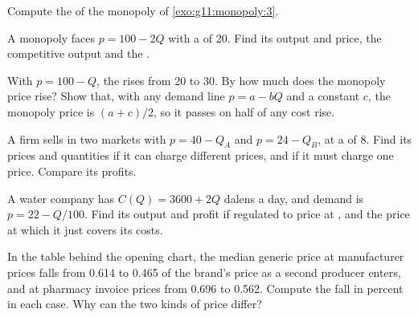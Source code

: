 \begin{exercise}[$\star\star$]\label{exo:g11:monopoly:6}
Compute the  of the monopoly of \cref{exo:g11:monopoly:3}.
\end{exercise}

\begin{exercise}[$\star\star$]\label{exo:g11:monopoly:7}
A monopoly faces $p = 100 - 2Q$ with a  of 20. Find its output and price, the competitive output and the .
\end{exercise}

\begin{exercise}[$\star\star$]\label{exo:g11:monopoly:8}
With $p = 100 - Q$, the  rises from 20 to 30. By how much does the monopoly price rise? Show that, with any demand line $p = a - bQ$ and a constant  $c$, the monopoly price is $(a + c)/2$, so it passes on half of any cost rise.
\end{exercise}

\begin{exercise}[$\star\star$]\label{exo:g11:monopoly:9}
A firm sells in two markets with $p = 40 - Q_A$ and $p = 24 - Q_B$, at a  of 8. Find its prices and quantities if it can charge different prices, and if it
must charge one price. Compare its profits.
\end{exercise}

\begin{exercise}[$\star\star$]\label{exo:g11:monopoly:10}
A water company has $C(Q) = 3600 + 2Q$ dalens a day, and demand is $p = 22 - Q/100$. Find its output and profit if regulated to price at , and the price at
which it just covers its costs.
\end{exercise}

\begin{exercise}[$\star\star$]\label{exo:g11:monopoly:11}
In the table behind the opening chart, the median generic price at manufacturer prices falls from 0.614 to 0.465 of the brand's price as a second producer enters, and at
pharmacy invoice prices from 0.696 to 0.562. Compute the fall in percent in each case. Why can the two kinds of price differ?
\end{exercise}

